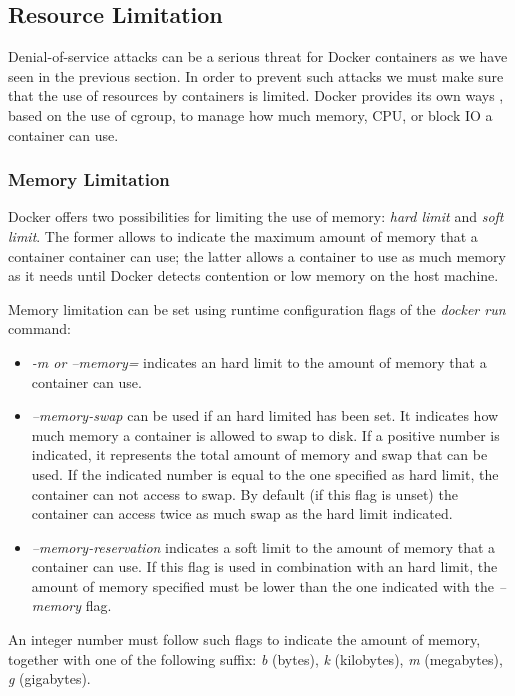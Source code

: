 \documentclass[a4paper,12pt]{article}
\begin{document}
\subsection{Resource Limitation}

Denial-of-service attacks can be a serious threat for Docker containers as we
have seen in the previous section. In order to prevent such attacks we must make
sure that the use of resources by containers is limited. Docker provides its own
ways \cite{resource_on_docker}, based on the use of cgroup, to manage
how much memory, CPU, or block IO a container can use.

\subsubsection{Memory Limitation}

Docker offers two possibilities for limiting the use of memory: \textit{hard
limit} and \textit{soft limit}. The former allows to indicate the maximum amount
of memory that a container container can use; the latter allows a container to
use as much memory as it needs until Docker detects contention or low memory on
the host machine. \par Memory limitation can be set using runtime configuration
flags of the \textit{docker run} command: 
\begin{itemize}
  \item \textit{-m or --memory=} indicates an hard limit to the amount
  of memory that a container can use.
  \item \textit{--memory-swap} can be used if an hard limited has been set. It
  indicates how much memory a container is allowed to swap to disk. If a
  positive number is indicated, it represents the total amount of memory and
  swap that can be used. If the indicated number is equal to the one specified
  as hard limit, the container can not access to swap. By default (if this flag is
  unset) the container can access twice as much swap as the hard limit indicated.
  \item \textit{--memory-reservation} indicates a soft limit to the amount
  of memory that a container can use. If this flag is used in combination with
  an hard limit, the amount of memory specified must be lower than the one
  indicated with the \textit{--memory} flag.
\end{itemize}
An integer number must follow such flags to indicate the amount of memory,
together with one of the following suffix: \textit{b} (bytes), \textit{k}
(kilobytes), \textit{m} (megabytes), \textit{g} (gigabytes).
  
\end{document}
